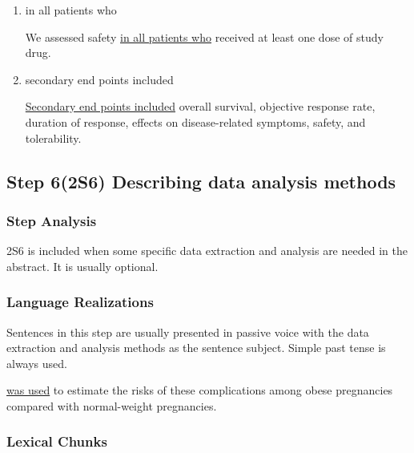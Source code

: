 \documentclass{ctexbook}
\begin{document}
\begin{enumerate}
      \item in all patients who
      \begin{eg}{}
        We assessed safety \uline{in all patients who} received at least one dose of study drug. 
      \end{eg}

      \item secondary end points included
      \begin{eg}{}
        \uline{Secondary end points included} overall survival, objective response rate, duration of response, effects on disease-related symptoms, safety, and tolerability.
      \end{eg}
    \end{enumerate}

  \subsection{Step 6(2S6) Describing data analysis methods}

    \subsubsection{Step Analysis}

    2S6 is included when some specific data extraction and analysis are needed in the abstract. It is usually optional.

    \subsubsection{Language Realizations}

    Sentences in this step are usually presented in passive voice with the data extraction and analysis methods as the sentence subject. Simple past tense is always used.

    \begin{eg}{}
       \uline{was used} to estimate the risks of these complications among obese pregnancies compared with normal-weight pregnancies.    
    \end{eg}

    \subsubsection{Lexical Chunks}
\end{document}
